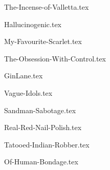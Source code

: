 \begin{songs}{}
  {The-Incense-of-Valletta.tex}

  {Hallucinogenic.tex}
  \sclearpage

  {My-Favourite-Scarlet.tex}
  \sclearpage

  {The-Obsession-With-Control.tex}
  \sclearpage

  {GinLane.tex}
  \sclearpage

  {Vague-Idols.tex}

  {Sandman-Sabotage.tex}

  {Real-Red-Nail-Polish.tex}
  \sclearpage

  {Tatooed-Indian-Robber.tex}

  {Of-Human-Bondage.tex}
  \sclearpage

\end{songs}
